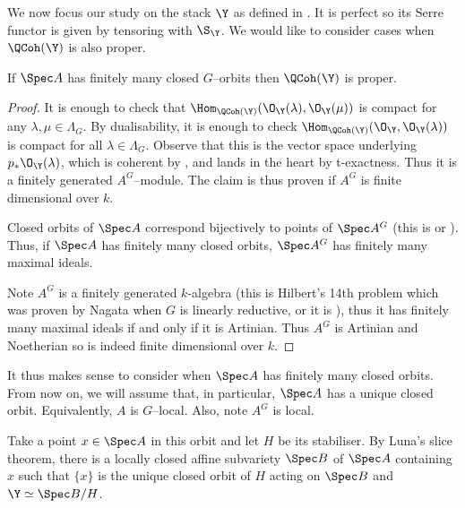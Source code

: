 \documentclass{amsart}
\begin{document}
  \label{sec:serre_affine}


  We now focus our study on the stack \(\Y\) 
  as defined in . It
  is perfect so its Serre functor is
  given by tensoring with \(\S_\Y\). We would
  like to consider cases when \(\QCoh(\Y)\)
  is also proper.


  \begin{prop}
    If \(\Spec A\) has finitely many closed \(G\)--orbits then 
    \(\QCoh(\Y)\) is proper.
  \end{prop}
  \begin{proof}
    It is enough to check that \(\Hom_{\QCoh(\Y)}(\O_\Y(\lambda), \O_\Y(\mu))\)
    is compact for any \(\lambda, \mu \in \Lambda_G\). 
    By dualisability, it is enough to check
    \(\Hom_{\QCoh(\Y)}(\O_\Y, \O_\Y(\lambda))\) is compact
    for all \(\lambda \in \Lambda_G\).
    Observe that this is the vector space underlying
    \(p_\ast \O_\Y(\lambda)\), which is coherent by \cite[Theorem 4.16(x)]{alper:2013},
    and lands in the heart by t-exactness. Thus it is a finitely
    generated \(A^G\)--module. The claim is thus proven
    if \(A^G\) is finite dimensional over \(k\).

    Closed orbits of \(\Spec A\) correspond bijectively to
    points of \(\Spec A^G\) (this is \cite[Theorem 4.16(iv)]{alper:2013} 
    or \cite[Proposition 0.1, Theorem 1.1]{mumford:1994}). Thus,
    if \(\Spec A\) has finitely many closed orbits, \(\Spec A^G\)
    has finitely many maximal ideals.

    Note \(A^G\) is a finitely generated \(k\)-algebra
    (this is Hilbert's 14th problem which was proven by Nagata
    when \(G\) is linearly reductive, or it is \cite[Theorem 4.16(xi)]{alper:2013}),
    thus it has finitely many maximal ideals if and only if it is
    Artinian. Thus \(A^G\) is Artinian and Noetherian so
    is indeed finite dimensional over \(k\).
  \end{proof}

  \sssec{}

  It thus makes sense to consider when \(\Spec A\)
  has finitely many closed orbits. From now on,
  we will assume that, in particular, \(\Spec A\)
  has a unique closed orbit. Equivalently,
  \(A\) is \(G\)--local. Also, note \(A^G\) is local.

  Take a point \(x \in \Spec A\) in this orbit
  and let \(H\) be its stabiliser. By Luna's slice
  theorem, there is a locally closed affine
  subvariety \(\Spec B\) of \(\Spec A\)
  containing \(x\) such that \(\{x\}\)
  is the unique closed orbit of \(H\)
  acting on \(\Spec B\) and \(\Y \simeq \Spec B/H\).
  
\end{document}
